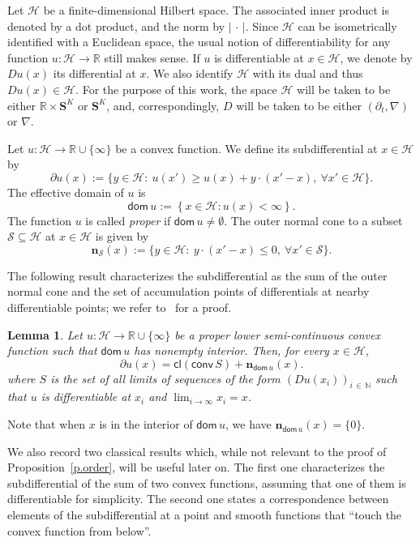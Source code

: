 \documentclass[10pt]{amsart}
\newtheorem{lemm}[theo]{Lemma}\newtheorem{prop}[theo]{Proposition}\newtheorem{coro}[theo]{Corollary}\newtheorem{conj}[theo]{Conjecture}
\theoremstyle{definition}\newtheorem{defi}[theo]{Definition}\newtheorem{rema}[theo]{Remark}\newtheorem{exam}[theo]{Example}\newtheorem{exem}[theo]{Example}\newtheorem{nota}[theo]{Notation}
\newcommand{\N}{\mathbb{N}}
\newcommand{\R}{\mathbb{R}}
\renewcommand{\S}{\mathbf{S}}
\newcommand{\bfn}{\mathbf{n}}
\newcommand{\dom}{\mathsf{dom}}
\newcommand{\cl}{\mathsf{cl}}
\newcommand{\conv}{\mathsf{conv}}
\newcommand{\scH}{\mathscr{H}}
\newcommand{\scS}{\mathscr{S}}
\renewcommand{\leq}{\leqslant}
\renewcommand{\geq}{\geqslant}
\renewcommand{\subset}{\subseteq}
\let\oldforall\forall
\renewcommand*{\forall}{\mathrel{\oldforall}}
\begin{document}
Let $\scH$ be a finite-dimensional Hilbert space. The associated inner product is denoted by a dot product, and the norm by $|\,\cdot\,|$. Since $\scH$ can be isometrically identified with a Euclidean space, the usual notion of differentiability for any function $u:\scH \to \R$ still makes sense. If $u$ is differentiable at $x\in \scH$, we denote by $Du(x)$ its differential at $x$. We also identify $\scH$ with its dual and thus $Du(x)\in \scH$. For the purpose of this work, the space $\scH$ will be taken to be either $\R\times \S^K$ or $\S^K$, and, correspondingly, $D$ will be taken to be either $(\partial_t,\nabla)$ or $\nabla$.

Let $u:\scH\to \R\cup\{\infty\}$ be a convex function. We define its subdifferential at $x\in\scH$ by
\begin{equation}\label{e.def.subdiff}
\partial u(x) := \Big\{y\in\scH:\ u(x')\geq u(x)+ y\cdot(x'-x),\ \forall x'\in\scH\Big\}.
\end{equation}
The effective domain of $u$ is
\[
\dom\, u := \left\{x \in \scH:u(x)<\infty\right\}.
\]
The function $u$ is called \emph{proper} if $\dom\, u\neq \emptyset$. The outer normal cone to a subset $\scS \subset \scH$ at $x\in\scH$ is given by
\begin{equation}\label{e.def_outer_normal}
\bfn_{\scS}(x) := \big\{y\in\scH:\ y\cdot\left(x'-x\right)\leq 0,\ \forall x'\in \scS\big\}.
\end{equation}


The following result characterizes the subdifferential as the sum of the outer normal cone and the set of accumulation points of differentials at nearby differentiable points; we refer to~\cite[Theorem~25.6]{rockafellar1970convex} for a proof.

\begin{lemm}\label{l.char_subd}
Let $u:\scH\to \R\cup\{\infty\}$ be a proper lower semi-continuous convex function such that $\dom\, u$ has nonempty interior. Then, for every $x \in \scH$,
\[
\partial u(x) = \cl(\conv\, S) + \bfn_{\dom\, u}(x).
\]
where $S$ is the set of all limits of sequences of the form $(Du(x_i))_{i\,\in\,\N}$ such that $u$ is differentiable at $x_i$ and $\lim_{i\to\infty}x_i = x$.
\end{lemm}

Note that when $x$ is in the interior of $\dom\,u$, we have $\bfn_{\dom\, u}(x)=\{0\}$.



We also record two classical results which, while not relevant to the proof of Proposition~\ref{p.order}, will be useful later on. The first one characterizes the subdifferential of the sum of two convex functions, assuming that one of them is differentiable for simplicity. The second one states a correspondence between elements of the subdifferential at a point and smooth functions that ``touch the convex function from below''.
\end{document}

